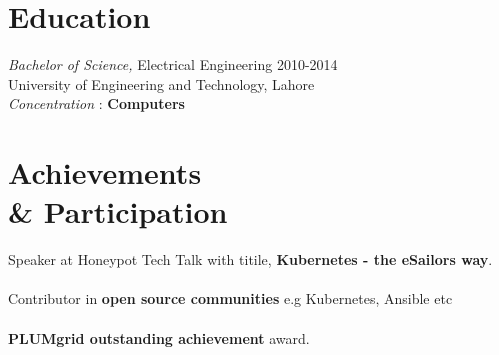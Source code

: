 \documentclass[margin]{res}
\begin{document}
\begin{resume}
\section{Education} {\sl Bachelor of Science,} Electrical Engineering \hfill 2010-2014 \\
                University of Engineering and Technology, Lahore \\
	             \textit{Concentration} : \textbf{Computers}

\section{Achievements \\ \& Participation} Speaker at Honeypot Tech Talk with titile, \textbf{Kubernetes - the eSailors way}. \\ \\
Contributor in \textbf{open source communities} e.g Kubernetes, Ansible etc \\ \\
\textbf{PLUMgrid outstanding achievement} award. \\ \\
\end{resume}
\end{document}

